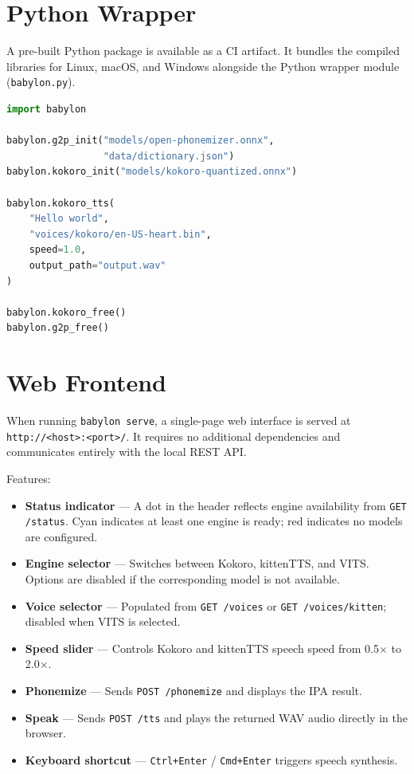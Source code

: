 \documentclass[12pt,a4paper]{article}
\begin{document}
\section{Python Wrapper}
\label{sec:python}

A pre-built Python package is available as a CI artifact. It bundles the compiled libraries for Linux, macOS, and Windows alongside the Python wrapper module (\texttt{babylon.py}).

\begin{lstlisting}[language=python]
import babylon

babylon.g2p_init("models/open-phonemizer.onnx",
                 "data/dictionary.json")
babylon.kokoro_init("models/kokoro-quantized.onnx")

babylon.kokoro_tts(
    "Hello world",
    "voices/kokoro/en-US-heart.bin",
    speed=1.0,
    output_path="output.wav"
)

babylon.kokoro_free()
babylon.g2p_free()
\end{lstlisting}

\section{Web Frontend}

When running \texttt{babylon serve}, a single-page web interface is served at \texttt{http://\textless{}host\textgreater{}:\textless{}port\textgreater{}/}. It requires no additional dependencies and communicates entirely with the local REST API.

Features:

\begin{itemize}[noitemsep]
    \item \textbf{Status indicator} — A dot in the header reflects engine availability from \texttt{GET /status}. Cyan indicates at least one engine is ready; red indicates no models are configured.
    \item \textbf{Engine selector} — Switches between Kokoro, kittenTTS, and VITS. Options are disabled if the corresponding model is not available.
    \item \textbf{Voice selector} — Populated from \texttt{GET /voices} or \texttt{GET /voices/kitten}; disabled when VITS is selected.
    \item \textbf{Speed slider} — Controls Kokoro and kittenTTS speech speed from 0.5$\times$ to 2.0$\times$.
    \item \textbf{Phonemize} — Sends \texttt{POST /phonemize} and displays the IPA result.
    \item \textbf{Speak} — Sends \texttt{POST /tts} and plays the returned WAV audio directly in the browser.
    \item \textbf{Keyboard shortcut} — \texttt{Ctrl+Enter} / \texttt{Cmd+Enter} triggers speech synthesis.
\end{itemize}
\end{document}
